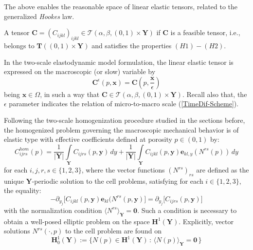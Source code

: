 The above enables the reasonable space of linear elastic tensors, related to the generalized \textit{Hookes} law.
\begin{defn}
A tensor $\mathbf{C} = (C_{ijkl})_{ijkl} \in \mathcal{T}(\alpha, \beta, (0,1)\times \mathbf{Y})$
if $\mathbf{C}$ is a feasible tensor, i.e., belongs to $\mathbf{T}((0,1)\times \mathbf{Y})$ and satisfies the properties $(H1)-(H2)$.
\end{defn}
\begin{rem}
In the two-scale elastodynamic model formulation, the linear elastic tensor is expressed on the macroscopic (or slow) variable by
\begin{equation*}
    \mathbf{C}^{\epsilon}(p,\mathbf{x}) =\mathbf{C}(p,\frac{\mathbf{x}}{\epsilon})
\end{equation*} being $\mathbf{x}\in \Omega$, in such a way that $\mathbf{C} \in \mathcal{T}(\alpha, \beta, (0,1)\times \mathbf{Y})$. Recall also that, the $\epsilon$ parameter indicates the relation of micro-to-macro scale (\ref{TimeDif-Scheme}).
\end{rem}
Following the two-scale homogenization procedure studied in the sections before, the homogenized problem governing the macroscopic mechanical behavior is of elastic type with effective coefficients defined at porosity $p \in (0,1)$ by:
\begin{equation}
    \label{eq:homogenized-coeff}
    C^{hom}_{ijrs}(p) = \frac{1}{\vert \mathbf{Y}\vert} \int\limits_{\mathbf{Y}} C_{ijrs}(p,\mathbf{y}) \, dy + \frac{1}{\vert \mathbf{Y}\vert} \int\limits_{\mathbf{Y}} C_{ijkl}(p,\mathbf{y}) \mathbf{e}_{kl,y}( N^{rs}(p))\,dy
\end{equation}
for each $ i,j,r,s \in \{1,2,3\}$, where the vector functions $(N^{rs})_{rs}$ are defined as the unique $\mathbf{Y}$-periodic solution to the cell problems, satisfying for each $i \in \{1,2,3\}$, the equality:
\begin{equation}
    \label{eq:cell}
    -\partial_{y_j} \big[ C_{ijkl}(p,\mathbf{y}) \mathbf{e}_{kl}(N^{rs}(p,\mathbf{y}) \big] = \partial_{y_j} \big[ C_{ijrs}(p,\mathbf{y}) \big] 
\end{equation}
with the normalization condition $\langle N^{rs} \rangle_{\mathbf{Y}} = \mathbf{0}$. Such a condition is necessary to obtain a well-posed elliptic problem on the space $\mathbf{H}^1(\mathbf{Y})$.
Explicitly, vector solutions $N^{rs}(\cdot,p)$ to the cell problem are found on   
\begin{equation*}
    \mathbf{H}^1_{ 0} (\mathbf{Y}) := \big \{ N(p) \in  \mathbf{H}^1(\mathbf{Y}) \, : \, \langle N(p) \rangle_{\mathbf{Y}}=\mathbf{0} \, \big \}
\end{equation*}

